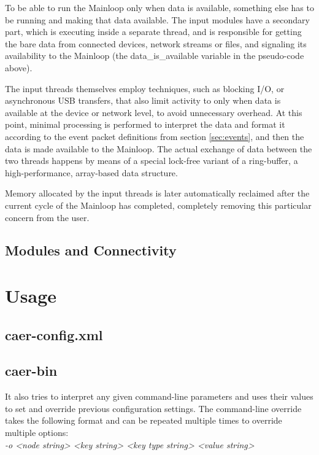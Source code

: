 \documentclass[a4paper,12pt]{report}
\begin{document}
To be able to run the Mainloop only when data is available, something else has to be running and making that data available. The input modules have a secondary part, which is executing inside a separate thread, and is responsible for getting the bare data from connected devices, network streams or files, and signaling its availability to the Mainloop (the data\_is\_available variable in the pseudo-code above).

The input threads themselves employ techniques, such as blocking I/O, or asynchronous USB transfers, that also limit activity to only when data is available at the device or network level, to avoid unnecessary overhead. At this point, minimal processing is performed to interpret the data and format it according to the event packet definitions from section \ref{sec:events}, and then the data is made available to the Mainloop.
The actual exchange of data between the two threads happens by means of a special lock-free variant of a ring-buffer, a high-performance, array-based data structure.

Memory allocated by the input threads is later automatically reclaimed after the current cycle of the Mainloop has completed, completely removing this particular concern from the user.

\section{Modules and Connectivity} \label{sec:modules_and_connectivity}

\chapter{Usage} \label{chap:usage}

\section{caer-config.xml}

\section{caer-bin}

It also tries to interpret any given command-line parameters and uses their values to set and override previous configuration settings.
The command-line override takes the following format and can be repeated multiple times to override multiple options:
\\\emph{-o <node string> <key string> <key type string> <value string>}
\end{document}
